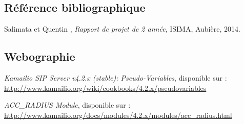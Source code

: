 
\subsection*{Référence bibliographique}

\noindent[1] Salimata  et Quentin , \textit{Rapport de projet de 2 année}, ISIMA, Aubière, 2014.

\subsection*{Webographie}

\noindent[2] \textit{Kamailio SIP Server v4.2.x (stable): Pseudo-Variables}, disponible sur : \url{http://www.kamailio.org/wiki/cookbooks/4.2.x/pseudovariables}

\noindent[3] \textit{ACC\_RADIUS Module}, disponible sur : \url{http://www.kamailio.org/docs/modules/4.2.x/modules/acc_radius.html}
